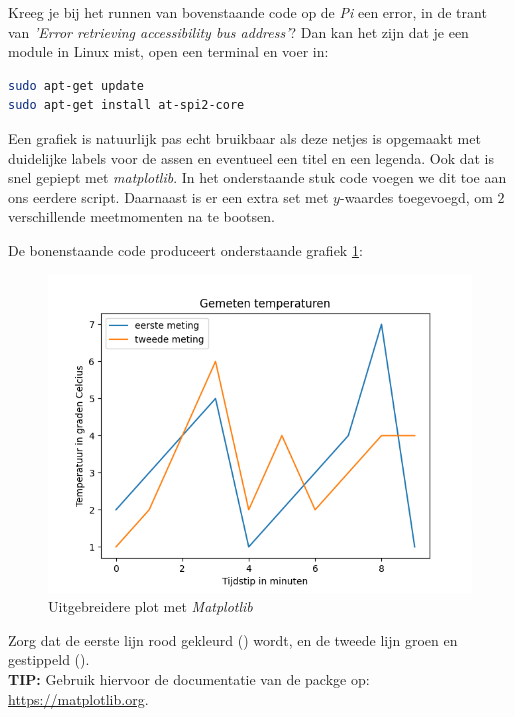 \newpage

\begin{remark}
Kreeg je bij het runnen van bovenstaande code op de \textit{Pi} een error, in de trant van \textit{'Error retrieving accessibility bus address'}? Dan kan het zijn dat je een module in Linux mist, open een terminal en voer in: 
\begin{lstlisting}[language=bash]
sudo apt-get update
sudo apt-get install at-spi2-core
\end{lstlisting}
\end{remark}

Een grafiek is natuurlijk pas echt bruikbaar als deze netjes is opgemaakt met duidelijke labels voor de assen en eventueel een titel en een legenda. Ook dat is snel gepiept met \textit{matplotlib}. In het onderstaande stuk code voegen we dit toe aan ons eerdere script. Daarnaast is er een extra set met $y$-waardes toegevoegd, om $2$ verschillende meetmomenten na te bootsen.


De bonenstaande code produceert onderstaande grafiek \ref{fig:plot2}:
\begin{figure}[h!]
\centering\includegraphics[scale=0.7]{Pictures/chapter07/plot2.png}
\caption{Uitgebreidere plot met \textit{Matplotlib}}
\label{fig:plot2} 
\end{figure}

\begin{exercise}
Zorg dat de eerste lijn rood gekleurd () wordt, en de tweede lijn groen en gestippeld (). \\
\textbf{TIP: } Gebruik hiervoor de documentatie van de packge op: \url{https://matplotlib.org}. 
\end{exercise}

